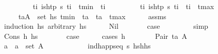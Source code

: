 \begin{isabellebody}
\ \ \ \ \ \ \ \ \ {\isachardoublequoteopen}{\isasymforall}t\isactrlsub i{\isachardot}{\kern0pt}\ is{\isacharunderscore}{\kern0pt}htp\ {\isasympi}s\ t\isactrlsub i\ {\isasymlongrightarrow}\ t\isactrlsub m\isactrlsub i\isactrlsub n\ {\isasymle}\ t\isactrlsub i{\isachardoublequoteclose}\isanewline
\ \ \ \ \ \ \ \ \ {\isachardoublequoteopen}{\isasymforall}t\isactrlsub i{\isachardot}{\kern0pt}\ is{\isacharunderscore}{\kern0pt}htp\ {\isasympi}s\ t\isactrlsub i\ {\isasymlongrightarrow}\ t\isactrlsub i\ {\isasymle}\ t\isactrlsub m\isactrlsub a\isactrlsub x{\isachardoublequoteclose}\isanewline
\ \ \ \ \ {\isachardoublequoteopen}{\isasymforall}{\isacharparenleft}{\kern0pt}t\isactrlsub a{\isacharcomma}{\kern0pt}A{\isacharparenright}{\kern0pt}\ {\isasymin}\ set\ hs{\isachardot}{\kern0pt}\ t\isactrlsub m\isactrlsub i\isactrlsub n\ {\isasymle}\ t\isactrlsub a\ {\isasymand}\ t\isactrlsub a\ {\isasymle}\ t\isactrlsub m\isactrlsub a\isactrlsub x{\isachardoublequoteclose}\isanewline
%
\isadelimproof
\ \ \ \ %
\endisadelimproof
%
\isatagproof
{}\isamarkupfalse%
\ assms\isanewline
\ \ \isamarkupfalse%
\ {\isacharparenleft}{\kern0pt}induction\ hs\ arbitrary{\isacharcolon}{\kern0pt}\ hs{\isacharprime}{\kern0pt}{\isacharparenright}{\kern0pt}\isanewline
\ \ \ \ \isamarkupfalse%
\ Nil\isanewline
\ \ \ \ \isamarkupfalse%
\ \isamarkupfalse%
\ {\isacharquery}{\kern0pt}case\ \isanewline
\ \ \ \ \ \ \isamarkupfalse%
\ simp\isanewline
\ \ \isamarkupfalse%
\isanewline
\ \ \ \ \isamarkupfalse%
\ {\isacharparenleft}{\kern0pt}Cons\ h\ hs{\isacharparenright}{\kern0pt}\isanewline
\ \ \ \ \isamarkupfalse%
\ \isamarkupfalse%
\ {\isacharquery}{\kern0pt}case\isanewline
\ \ \ \ \isamarkupfalse%
\ {\isacharparenleft}{\kern0pt}cases\ h{\isacharparenright}{\kern0pt}\isanewline
\ \ \ \ \ \ \isamarkupfalse%
\ {\isacharparenleft}{\kern0pt}Pair\ t\isactrlsub a\ A{\isacharparenright}{\kern0pt}\isanewline
\ \ \ \ \ \ \ \ \isamarkupfalse%
\ \isamarkupfalse%
\ a\ \ {\isachardoublequoteopen}a\ {\isasymin}\ set\ A{\isachardoublequoteclose}\isanewline
\ \ \ \ \ \ \ \ \ \ \isamarkupfalse%
\ {\isacartoucheopen}ind{\isacharunderscore}{\kern0pt}happ{\isacharunderscore}{\kern0pt}seq\ {\isasympi}s\ {\isacharparenleft}{\kern0pt}hs{\isacharprime}{\kern0pt}{\isacharat}{\kern0pt}h{\isacharhash}{\kern0pt}hs{\isacharparenright}{\kern0pt}{\isacartoucheclose}\ \isamarkupfalse%

\end{isabellebody}
